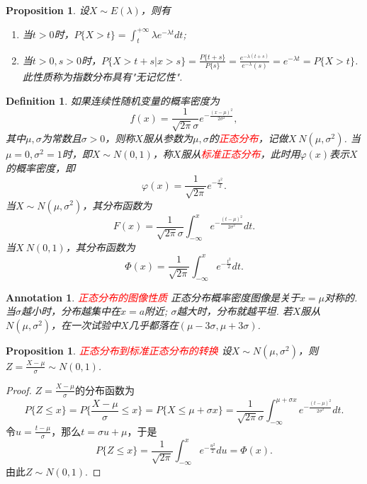 \documentclass{article}
\newtheorem{proposition}[theorem]{Proposition}
\newtheorem{definition}[theorem]{Definition}
\newtheorem{annotation}[theorem]{Annotation}
\newcommand{\redt}[1]{\textcolor{red}{#1}}
\begin{document}
\begin{proposition}
\rm 设$X \sim E(\lambda)$，则有
\begin{enumerate}
	\item 当$t > 0$时，$P\{X > t\} = \int_t^{+\infty} \lambda e^{-\lambda t}dt$;
	\item 当$t > 0, s >0$时，$P\{X > t+s |x > s\} = \frac{P\{t+s\}}{P\{s\}} = \frac{e^{-\lambda(t+s)}}{e^{-\lambda}(s)} = e^{-\lambda t} = P\{X > t\}$. 此性质称为指数分布具有"无记忆性". 
\end{enumerate}
\end{proposition}

\begin{definition}
\rm 如果连续性随机变量的概率密度为
$$
f(x) = \frac{1}{\sqrt{2\pi}\sigma}e^{-\frac{(x-\mu)^2}{2\sigma^2}},
$$
其中$\mu,\sigma$为常数且$\sigma > 0$，则称$X$服从参数为$\mu,\sigma$的\redt{正态分布}，记做$X~N(\mu,\sigma^2)$. 当$\mu=0,\sigma^2 =1$时，即$X \sim N(0,1)$，称$X$服从\redt{标准正态分布}，此时用$\varphi(x)$表示$X$的概率密度，即
$$
\varphi(x) = \frac{1}{\sqrt{2\pi}}e^{-\frac{x^2}{2}}.
$$
当$X \sim N(\mu,\sigma^2)$，其分布函数为
$$
F(x) = \frac{1}{\sqrt{2\pi}\sigma}\int_{-\infty}^{x}e^{-\frac{(t-\mu)^2}{2\sigma^2}}dt. 
$$
当$X~N(0,1)$，其分布函数为
$$
\Phi(x) = \frac{1}{\sqrt{2\pi}}\int_{-\infty}^x e^{-\frac{t^2}{2}}dt.
$$
\end{definition}

\begin{annotation}
\rm \redt{正态分布的图像性质} 正态分布概率密度图像是关于$x = \mu$对称的. 当$\sigma$越小时，分布越集中在$x=a$附近; $\sigma$越大时，分布就越平坦. 若$X$服从$N(\mu,\sigma^2)$，在一次试验中$X$几乎都落在$(\mu-3\sigma,\mu + 3\sigma)$.
\end{annotation}

\begin{proposition}
\rm \redt{正态分布到标准正态分布的转换} 设$X \sim N(\mu,\sigma^2)$，则$Z = \frac{X-\mu}{\sigma} \sim N(0,1)$. 
\end{proposition}

\begin{proof}
\rm $Z=\frac{X-\mu}{\sigma}$的分布函数为
$$
P\{Z \leq x\} = P\{\frac{X-\mu}{\sigma} \leq x\} = P\{X \leq \mu + \sigma x\} =  \frac{1}{\sqrt{2\pi}\sigma}\int_{-\infty}^{\mu+\sigma x}e^{-\frac{(t-\mu)^2}{2\sigma^2}}dt.
$$
令$u = \frac{t-\mu}{\sigma}$，那么$t = \sigma u + \mu$，于是
$$
P\{Z \leq x\} = \frac{1}{\sqrt{2\pi}}\int_{-\infty}^{x} e^{-\frac{u^2}{2}}du = \Phi(x). 
$$
由此$Z \sim N(0,1)$.
\end{proof}
\end{document}
